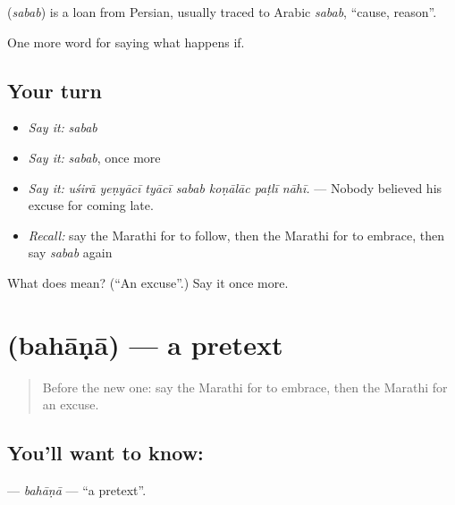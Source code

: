 \begin{cousinweb}
\textbf{} (\emph{sabab}) is a loan from Persian, usually traced to Arabic \emph{sabab}, \textquotedblleft{}cause, reason\textquotedblright{}.
\end{cousinweb}

\begin{grammarlens}[title={What you've built}]
One more word for saying what happens if.
\end{grammarlens}

\subsection*{Your turn}
\begin{itemize}
\raggedright
  \item \emph{Say it:} \emph{sabab}
  \item \emph{Say it:} \emph{sabab}, once more
  \item \emph{Say it:} \emph{uśirā yeṇyācī tyācī sabab koṇālāc paṭlī nāhī.} — Nobody believed his excuse for coming late.
  \item \emph{Recall:} say the Marathi for to follow, then the Marathi for to embrace, then say \emph{sabab} again
\end{itemize}

\begin{tcolorbox}[breakable,colback=teal!4,colframe=teal!35!black,title={Before you move on}]
What does  mean? (\textquotedblleft{}An excuse\textquotedblright{}.) Say it once more.
\end{tcolorbox}
\section[\texorpdfstring{\mr{बहाणा} (bahāṇā)}{बहाणा (bahāṇā)}]{ (bahāṇā) — a pretext}

\label{lesson:MR-C393-bahana}



\begin{quote}
Before the new one: say the Marathi for to embrace, then the Marathi for an excuse.
\end{quote}

\subsection*{You'll want to know: }
\textbf{} — \emph{bahāṇā} — \textquotedblleft{}a pretext\textquotedblright{}.

